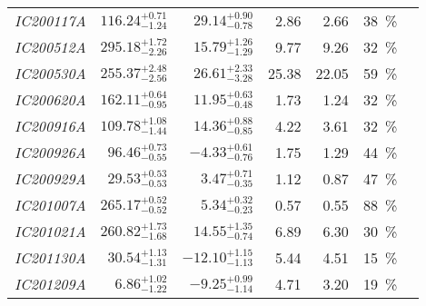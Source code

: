 \begin{table*}
\begin{tabular}{l r r r r c c}
    \emph{IC200117A} & $116.24^{+0.71}_{-1.24}$ & $29.14^{+0.90}_{-0.78}$  & 2.86                 & 2.66                 & \SI{38}{\percent}  & \cite{IC200117A1, IC200117A2, IC200117A3}             \\
    \emph{IC200512A} & $295.18^{+1.72}_{-2.26}$ & $15.79^{+1.26}_{-1.29}$  & 9.77                 & 9.26                 & \SI{32}{\percent}  & \cite{IC200512A1, IC200512A2}                         \\
    \emph{IC200530A} & $255.37^{+2.48}_{-2.56}$ & $26.61^{+2.33}_{-3.28}$  & 25.38                & 22.05                & \SI{59}{\percent}  & \cite{IC200530A1, IC200530A2, IC200530A3, IC200530A4} \\
    \emph{IC200620A} & $162.11^{+0.64}_{-0.95}$ & $11.95^{+0.63}_{-0.48}$  & 1.73                 & 1.24                 & \SI{32}{\percent}  & \cite{IC200620A1, IC200620A2}                         \\
    \emph{IC200916A} & $109.78^{+1.08}_{-1.44}$ & $14.36^{+0.88}_{-0.85}$  & 4.22                 & 3.61                 & \SI{32}{\percent}  & \cite{IC200916A1, IC200916A2, IC200916A3}             \\
    \emph{IC200926A} & $96.46^{+0.73}_{-0.55}$  & $-4.33^{+0.61}_{-0.76}$  & 1.75                 & 1.29                 & \SI{44}{\percent}  & \cite{IC200926A1, IC200926A2}                         \\
    \emph{IC200929A} & $29.53^{+0.53}_{-0.53}$  & $3.47^{+0.71}_{-0.35}$   & 1.12                 & 0.87                 & \SI{47}{\percent}  & \cite{IC200929A1, IC200929A2}                         \\
    \emph{IC201007A} & $265.17^{+0.52}_{-0.52}$ & $5.34^{+0.32}_{-0.23}$   & 0.57                 & 0.55                 & \SI{88}{\percent}  & \cite{IC201007A1, IC201007A2}                         \\
    \emph{IC201021A} & $260.82^{+1.73}_{-1.68}$ & $14.55^{+1.35}_{-0.74}$  & 6.89                 & 6.30                 & \SI{30}{\percent}  & \cite{IC201021A1, IC201021A2}                         \\
    \emph{IC201130A} & $30.54^{+1.13}_{-1.31}$  & $-12.10^{+1.15}_{-1.13}$ & 5.44                 & 4.51                 & \SI{15}{\percent}  & \cite{IC201130A1, IC201130A2}                         \\
    \emph{IC201209A} & $6.86^{+1.02}_{-1.22}$   & $-9.25^{+0.99}_{-1.14}$  & 4.71                 & 3.20                 & \SI{19}{\percent}  & \cite{IC201209A1, IC201209A2}                         \\

\end{tabular}
\end{table*}
